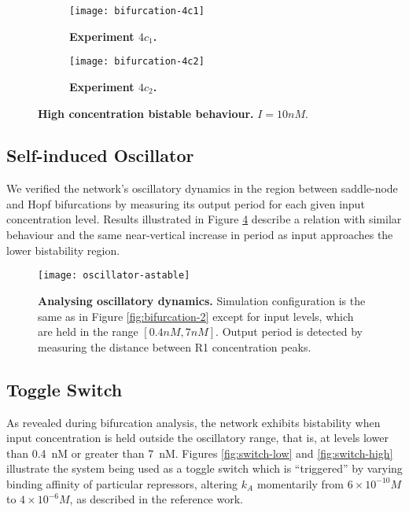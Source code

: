     \begin{figure}[!htb]
      \centering
      \begin{subfigure}[t]{0.72\textwidth}
        \centering
        \texttt{[image: bifurcation-4c1]}
        \caption{\textbf{Experiment $4c_{1}$.}}
        \label{fig:bifurcation-4c1}
      \end{subfigure}
      \begin{subfigure}[t]{0.72\textwidth}
        \centering
        \texttt{[image: bifurcation-4c2]}
        \caption{\textbf{Experiment $4c_{2}$.}}
        \label{fig:bifurcation-4c2}
      \end{subfigure}
      \caption{\textbf{High concentration bistable behaviour.} $I = 10 nM$.}
      \label{fig:bifurcation-4}
    \end{figure}


  \subsection{Self-induced Oscillator}

    We verified the network's oscillatory dynamics in the region between saddle-node and Hopf bifurcations by measuring its output period for each given input concentration level.
    Results illustrated in Figure \ref{fig:oscillator-astable} describe a relation with similar behaviour and the same near-vertical increase in period as input approaches the lower bistability region.

    \begin{figure}[!htb]
      \centering
      \texttt{[image: oscillator-astable]}
      \caption{\textbf{Analysing oscillatory dynamics.} Simulation configuration is the same as in Figure \ref{fig:bifurcation-2} except for input levels, which are held in the range $[0.4 nM, 7 nM]$. Output period is detected by measuring the distance between R1 concentration peaks.}
      \label{fig:oscillator-astable}
    \end{figure}


  \subsection{Toggle Switch}

    As revealed during bifurcation analysis, the network exhibits bistability when input concentration is held outside the oscillatory range, that is, at levels lower than \SI{0.4}{\nano M} or greater than \SI{7}{\nano M}.
    Figures \ref{fig:switch-low} and \ref{fig:switch-high} illustrate the system being used as a toggle switch which is ``triggered'' by varying binding affinity of particular repressors, altering $k_A$ momentarily from $6 \times 10^{-10} M$ to $4 \times 10^{-6} M$, as described in the reference work.

